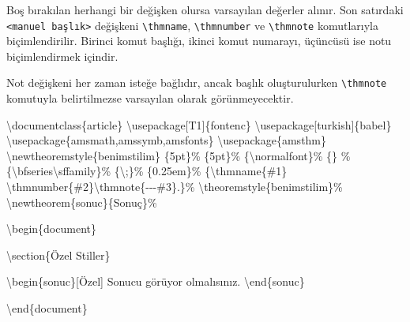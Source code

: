 \documentclass[
  letterpaper,
  DIV=11,
  numbers=noendperiod]{scrreprt}
\newenvironment{Shaded}{\begin{snugshade}}{\end{snugshade}}
\newcommand{\BuiltInTok}[1]{\textcolor[rgb]{0.00,0.23,0.31}{#1}}
\newcommand{\CommentTok}[1]{\textcolor[rgb]{0.37,0.37,0.37}{#1}}
\newcommand{\ExtensionTok}[1]{\textcolor[rgb]{0.00,0.23,0.31}{#1}}
\newcommand{\FunctionTok}[1]{\textcolor[rgb]{0.28,0.35,0.67}{#1}}
\newcommand{\KeywordTok}[1]{\textcolor[rgb]{0.00,0.23,0.31}{#1}}
\newcommand{\NormalTok}[1]{\textcolor[rgb]{0.00,0.23,0.31}{#1}}
\begin{document}
Boş bırakılan herhangi bir değişken olursa varsayılan değerler alınır.
Son satırdaki \texttt{\textless{}manuel\ başlık\textgreater{}} değişkeni
\texttt{\textbackslash{}thmname}, \texttt{\textbackslash{}thmnumber} ve
\texttt{\textbackslash{}thmnote} komutlarıyla biçimlendirilir. Birinci
komut başlığı, ikinci komut numarayı, üçüncüsü ise notu biçimlendirmek
içindir.

Not değişkeni her zaman isteğe bağlıdır, ancak başlık oluşturulurken
\texttt{\textbackslash{}thmnote} komutuyla belirtilmezse varsayılan
olarak görünmeyecektir.

\begin{Shaded}
\begin{Highlighting}[]
\BuiltInTok{\textbackslash{}documentclass}\NormalTok{\{}\ExtensionTok{article}\NormalTok{\}}
\BuiltInTok{\textbackslash{}usepackage}\NormalTok{[T1]\{}\ExtensionTok{fontenc}\NormalTok{\}}
\BuiltInTok{\textbackslash{}usepackage}\NormalTok{[turkish]\{}\ExtensionTok{babel}\NormalTok{\}}
\BuiltInTok{\textbackslash{}usepackage}\NormalTok{\{}\ExtensionTok{amsmath,amssymb,amsfonts}\NormalTok{\}}
\BuiltInTok{\textbackslash{}usepackage}\NormalTok{\{}\ExtensionTok{amsthm}\NormalTok{\}}
\FunctionTok{\textbackslash{}newtheoremstyle}\NormalTok{\{benimstilim\}}
\NormalTok{\{5pt\}}\CommentTok{\% }
\NormalTok{\{5pt\}}\CommentTok{\% }
\NormalTok{\{}\FunctionTok{\textbackslash{}normalfont}\NormalTok{\}}\CommentTok{\% }
\NormalTok{\{\} }\CommentTok{\%}
\NormalTok{\{}\FunctionTok{\textbackslash{}bfseries\textbackslash{}sffamily}\NormalTok{\}}\CommentTok{\%}
\NormalTok{\{}\FunctionTok{\textbackslash{};}\NormalTok{\}}\CommentTok{\% }
\NormalTok{\{0.25em\}}\CommentTok{\% }
\NormalTok{\{}\FunctionTok{\textbackslash{}thmname}\NormalTok{\{\#1\} }\FunctionTok{\textbackslash{}thmnumber}\NormalTok{\{\#2\}}\FunctionTok{\textbackslash{}thmnote}\NormalTok{\{{-}{-}{-}\#3\}.\}}\CommentTok{\%}
\FunctionTok{\textbackslash{}theoremstyle}\NormalTok{\{benimstilim\}}\CommentTok{\%}
\FunctionTok{\textbackslash{}newtheorem}\NormalTok{\{sonuc\}\{Sonuç\}}\CommentTok{\%}

\KeywordTok{\textbackslash{}begin}\NormalTok{\{}\ExtensionTok{document}\NormalTok{\}}

\KeywordTok{\textbackslash{}section}\NormalTok{\{Özel Stiller\}}

\KeywordTok{\textbackslash{}begin}\NormalTok{\{}\ExtensionTok{sonuc}\NormalTok{\}[Özel]}
\NormalTok{ Sonucu görüyor olmalısınız.}
\KeywordTok{\textbackslash{}end}\NormalTok{\{}\ExtensionTok{sonuc}\NormalTok{\}}



\KeywordTok{\textbackslash{}end}\NormalTok{\{}\ExtensionTok{document}\NormalTok{\}}
\end{Highlighting}
\end{Shaded}
\end{document}

